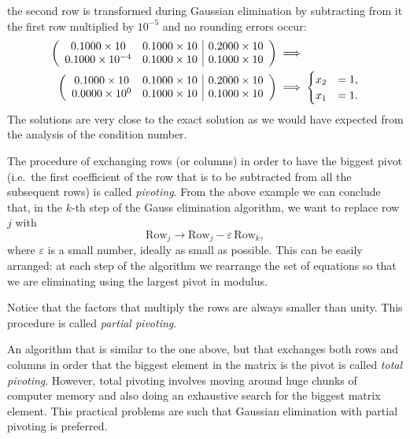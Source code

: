 the second row is transformed during Gaussian elimination by
subtracting from it the first row multiplied by $10^{-5}$ and no
rounding errors occur:
%
\begin{align}
  \left (
    \begin{array}{c c|c}
      0.1000 \times 10 & 0.1000 \times 10 & 0.2000 \times 10 \\
      0.1000 \times 10^{-4} & 0.1000 \times 10 & 0.1000 \times 10
    \end{array}
  \right ) & \implies \\
  \left (
    \begin{array}{c c|c}
      0.1000 \times 10 & 0.1000 \times 10 & 0.2000 \times 10 \\
      0.0000 \times 10^{0} & 0.1000 \times 10 & 0.1000 \times 10
    \end{array}
  \right ) & \implies
  \begin{cases}
    x_2 &= 1, \\ x_1 &= 1 .
  \end{cases}
\end{align}
%
The solutions are very close to the exact solution as we would have
expected from the analysis of the condition number.

The procedure of  exchanging rows  (or columns) in  order  to have the
biggest pivot  (i.e.\ the first  coefficient of the  row that is  to be
subtracted from all the  subsequent rows) is called \textit{pivoting}.
From the above example we can conclude that, in the $k$-th step of the
Gauss elimination algorithm, we want to replace row $j$ with
%
\begin{equation*}
  \text{Row}_j \rightarrow \text{Row}_j - \varepsilon \, \text{Row}_k,
\end{equation*}
%
where $\varepsilon$ is a small number, ideally as small as possible.
This can be easily arranged: at each step of the algorithm we
rearrange the set of equations so that we are eliminating using the
largest pivot in modulus.

Notice that the factors that multiply the rows are always smaller than
unity.    This procedure is called \textit{partial pivoting}.

An algorithm that is similar to the one above, but that exchanges both
rows and columns in order that the biggest element in the matrix is
the pivot is called \textit{total pivoting}.  However, total pivoting
involves moving around huge chunks of computer memory and also doing
an exhaustive search for the biggest matrix element.  This practical
problems are such that Gaussian elimination with partial pivoting
is preferred.


